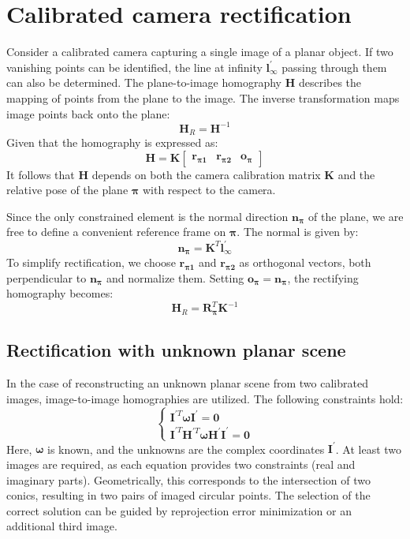 \section{Calibrated camera rectification}

Consider a calibrated camera capturing a single image of a planar object. 
If two vanishing points can be identified, the line at infinity $\mathbf{l}_{\infty}^{\prime}$ passing through them can also be determined.
The plane-to-image homography $\mathbf{H}$ describes the mapping of points from the plane to the image. 
The inverse transformation maps image points back onto the plane:
\[\mathbf{H}_R=\mathbf{H}^{-1}\]
Given that the homography is expressed as:
\[\mathbf{H}=\mathbf{K}\begin{bmatrix}\mathbf{r}_{\boldsymbol{\pi}\mathbf{1}} & \mathbf{r}_{\boldsymbol{\pi}\mathbf{2}} & \mathbf{o}_{\boldsymbol{\pi}}\end{bmatrix}\]
It follows that $\mathbf{H}$ depends on both the camera calibration matrix $\mathbf{K}$ and the relative pose of the plane $\boldsymbol{\pi}$ with respect to the camera.

Since the only constrained element is the normal direction $\mathbf{n}_{\boldsymbol{\pi}}$ of the plane, we are free to define a convenient reference frame on $\boldsymbol{\pi}$.
The normal is given by:
\[\mathbf{n}_{\boldsymbol{\pi}}=\mathbf{K}^T\mathbf{l}_{\infty}^{\prime}\]
To simplify rectification, we choose $\mathbf{r}_{\boldsymbol{\pi}\mathbf{1}}$ and $\mathbf{r}_{\boldsymbol{\pi}\mathbf{2}}$ as orthogonal vectors, both perpendicular to $\mathbf{n}_{\boldsymbol{\pi}}$ and normalize them.
Setting $\mathbf{o}_{\boldsymbol{\pi}}=\mathbf{n}_{\boldsymbol{\pi}}$, the rectifying homography becomes:
\[\mathbf{H}_R=\mathbf{R}_{\boldsymbol{\pi}}^T\mathbf{K}^{-1}\]

\subsection{Rectification with unknown planar scene}
In the case of reconstructing an unknown planar scene from two calibrated images, image-to-image homographies are utilized. 
The following constraints hold:
\[\begin{cases}\mathbf{I}^{\prime T}\boldsymbol{\omega}\mathbf{I}^{\prime}=\mathbf{0} \\ \mathbf{I}^{\prime T}\mathbf{H}^{\prime T}\boldsymbol{\omega}\mathbf{H}^{\prime}\mathbf{I}^{\prime}=\mathbf{0}\end{cases}\]
Here, $\boldsymbol{\omega}$ is known, and the unknowns are the complex coordinates $\mathbf{I}^{\prime}$. 
At least two images are required, as each equation provides two constraints (real and imaginary parts).
Geometrically, this corresponds to the intersection of two conics, resulting in two pairs of imaged circular points. 
The selection of the correct solution can be guided by reprojection error minimization or an additional third image.

